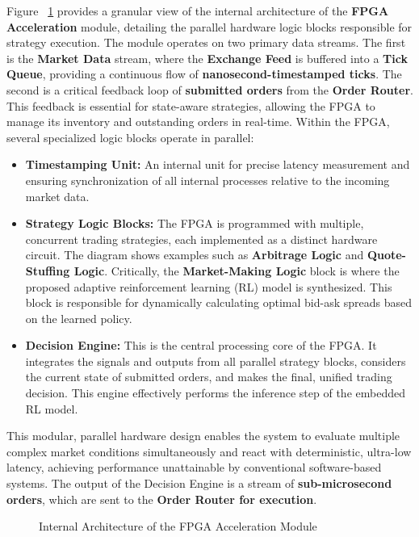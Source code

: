 Figure ~\ref{fig:fpga_internal_architecture} provides a granular view of the internal architecture of the \textbf{FPGA Acceleration} module, detailing the parallel hardware logic blocks responsible for strategy execution. The module operates on two primary data streams. The first is the \textbf{Market Data} stream, where the \textbf{Exchange Feed} is buffered into a \textbf{Tick Queue}, providing a continuous flow of \textbf{nanosecond-timestamped ticks}. The second is a critical feedback loop of \textbf{submitted orders} from the \textbf{Order Router}. This feedback is essential for state-aware strategies, allowing the FPGA to manage its inventory and outstanding orders in real-time. Within the FPGA, several specialized logic blocks operate in parallel: \begin{itemize} 
    \item \textbf{Timestamping Unit:} An internal unit for precise latency measurement and ensuring synchronization of all internal processes relative to the incoming market data. 
    \item \textbf{Strategy Logic Blocks:} The FPGA is programmed with multiple, concurrent trading strategies, each implemented as a distinct hardware circuit. The diagram shows examples such as \textbf{Arbitrage Logic} and \textbf{Quote-Stuffing Logic}. Critically, the \textbf{Market-Making Logic} block is where the proposed adaptive reinforcement learning (RL) model is synthesized. This block is responsible for dynamically calculating optimal bid-ask spreads based on the learned policy. 
    \item \textbf{Decision Engine:} This is the central processing core of the FPGA. It integrates the signals and outputs from all parallel strategy blocks, considers the current state of submitted orders, and makes the final, unified trading decision. This engine effectively performs the inference step of the embedded RL model. 
\end{itemize} This modular, parallel hardware design enables the system to evaluate multiple complex market conditions simultaneously and react with deterministic, ultra-low latency, achieving performance unattainable by conventional software-based systems. The output of the Decision Engine is a stream of \textbf{sub-microsecond orders}, which are sent to the \textbf{Order Router for execution}.

\begin{figure}
    \centering
    
    \caption{Internal Architecture of the FPGA Acceleration Module} 
    \label{fig:fpga_internal_architecture}
\end{figure}

